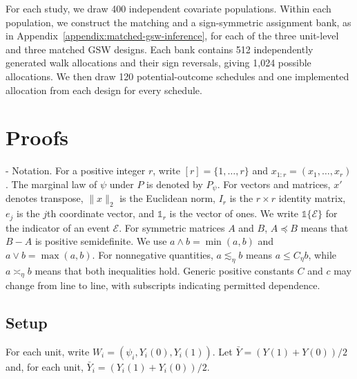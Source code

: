 \documentclass[letterpaper,12pt]{article}
\makeatletter
\theoremstyle{definition}
\numberwithin{equation}{section}
\newcommand{\ylevel}{\bar Y}
\newcommand{\norm}[1]{\lVert#1\rVert}
\renewcommand{\paragraph}{\@startsection{paragraph}{4}{\z@}%
  {\medskipamount}%
  {-\fontdimen2\font}%
  {\normalfont\normalsize\bfseries}}
\makeatother
\begin{document}
For each study, we draw 400 independent covariate populations.
Within each population, we construct the matching and a sign-symmetric assignment bank, as in Appendix~\ref{appendix:matched-gsw-inference}, for each of the three unit-level and three matched GSW designs.
Each bank contains 512 independently generated walk allocations and their sign reversals, giving 1,024 possible allocations.
We then draw 120 potential-outcome schedules and one implemented allocation from each design for every schedule.

\section{Proofs}\label{appendix:proofs}

\paragraph{Notation.}
For a positive integer $r$, write $[r]=\{1,\ldots,r\}$ and $x_{1:r}=(x_1,\ldots,x_r)$.
The marginal law of $\psi$ under $P$ is denoted by $P_\psi$.
For vectors and matrices, $x'$ denotes transpose, $\norm{x}_2$ is the Euclidean norm, $I_r$ is the $r\times r$ identity matrix, $e_j$ is the $j$th coordinate vector, and $\mathds{1}_r$ is the vector of ones.
We write $\mathds{1}\{\mathcal E\}$ for the indicator of an event $\mathcal E$.
For symmetric matrices $A$ and $B$, $A\preceq B$ means that $B-A$ is positive semidefinite.
We use $a\wedge b=\min(a,b)$ and $a\vee b=\max(a,b)$.
For nonnegative quantities, $a\lesssim_\eta b$ means $a\leq C_\eta b$, while $a\asymp_\eta b$ means that both inequalities hold.
Generic positive constants $C$ and $c$ may change from line to line, with subscripts indicating permitted dependence.

\subsection{Setup}\label{appendix:proofs-setup}

For each unit, write $W_i=(\psi_i,Y_i(0),Y_i(1))$.
Let $\ylevel=(Y(1)+Y(0))/2$ and, for each unit, $\ylevel_i=(Y_i(1)+Y_i(0))/2$.
\end{document}
